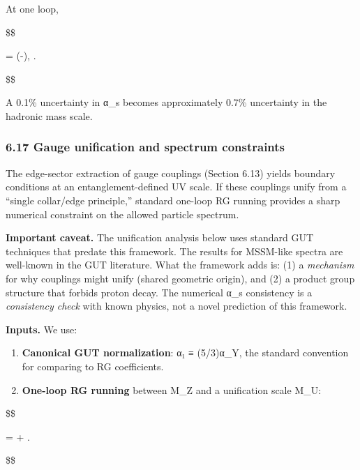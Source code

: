 \documentclass[11pt,a4paper]{article}
\theoremstyle{remark}
\begin{document}
At one loop,

\$\$

\Lambda = \mu \exp\left(-\right),
\qquad
{} .

\$\$

A 0.1\% uncertainty in α\_s becomes approximately 0.7\% uncertainty in the
hadronic mass scale.

\subsubsection{6.17 Gauge unification and spectrum constraints}\label{gauge-unification-and-spectrum-constraints}

The edge-sector extraction of gauge couplings (Section 6.13) yields boundary
conditions at an entanglement-defined UV scale. If these couplings unify from a
``single collar/edge principle,'' standard one-loop RG running provides a sharp
numerical constraint on the allowed particle spectrum.

\textbf{Important caveat.} The unification analysis below uses standard GUT
techniques that predate this framework. The results for MSSM-like spectra
are well-known in the GUT literature. What the framework adds is:
(1) a \emph{mechanism} for why couplings might unify (shared geometric origin),
and (2) a product group structure that forbids proton decay. The numerical
α\_s consistency is a \emph{consistency check} with known physics, not a
novel prediction of this framework.

\textbf{Inputs.} We use:

\begin{enumerate}
\def\labelenumi{\arabic{enumi}.}
\item
  \textbf{Canonical GUT normalization}: α₁ ≡ (5/3)α\_Y, the
  standard convention for comparing to RG coefficients.
\item
  \textbf{One-loop RG running} between M\_Z and a unification scale M\_U:
\end{enumerate}

\$\$

 =  + 
\ln{}.

\$\$
\end{document}
